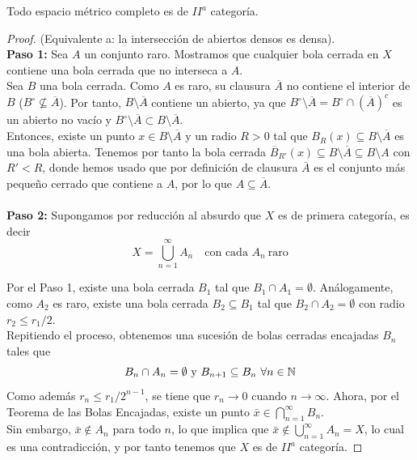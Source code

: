 \begin{teo}\label{teo:baire}
    Todo espacio métrico completo es de $II^a$ categoría.

\begin{proof}
    (Equivalente a: la intersección de abiertos densos es densa). \\
    \noindent
 \textbf{Paso 1:} Sea $A$ un conjunto raro. Mostramos que cualquier bola cerrada en $X$ contiene una bola cerrada que no interseca a $A$.\\
    Sea $B$ una bola cerrada. Como $A$ es raro, su clausura $\overline{A}$ no contiene el interior de $B$ ($B^\circ \not\subseteq \overline{A}$). Por tanto, $B \setminus \overline{A}$ contiene un abierto, ya que $B^\circ \setminus \overline{A}=B^\circ \cap (\overline{A})^c$ es un abierto no vacío y $B^\circ \setminus \overline{A}\subset B \setminus \overline{A}$.\\

    \noindent
    Entonces, existe un punto $x \in B \setminus \overline{A}$ y un radio $R > 0$ tal que $B_R(x) \subseteq B \setminus \overline{A}$ es una bola abierta. Tenemos por tanto la bola cerrada $\overline{B}_{R'}(x) \subseteq B \setminus \overline{A}\subseteq B \setminus A$ con $R' < R$, donde hemos usado que por definición de clausura $\overline{A}$ es el conjunto más pequeño cerrado que contiene a $A$, por lo que $A \subseteq \overline{A}$. \\ \\

    \noindent
    \textbf{Paso 2:} Supongamos por reducción al absurdo que $X$ es de primera categoría, es decir
    $$X = \bigcup_{n=1}^{\infty} A_n \quad \text{con cada } A_n \ \text{raro}$$

    \noindent
    Por el Paso 1, existe una bola cerrada $B_1$ tal que $B_1 \cap A_1 = \emptyset$. Análogamente, como $A_2$ es raro, existe una bola cerrada $B_2 \subseteq B_1$ tal que $B_2 \cap A_2 = \emptyset$ con radio $r_2 \leq r_1/2$. \\

    \noindent
    Repitiendo el proceso, obtenemos una sucesión de bolas cerradas encajadas $B_n$ tales que 
    \begin{equation*}
        B_n \cap A_n = \emptyset \text{ y } B_{n+1}\subseteq B_n \ \forall n \in \mathbb{N} 
    \end{equation*}
    Como además $r_n \leq r_1/2^{n-1}$, se tiene que $r_n \to 0$ cuando $n \to \infty$. Ahora, por el Teorema de las Bolas Encajadas, existe un punto $\bar{x} \in \bigcap_{n=1}^{\infty} B_n$. \\
    \noindent
    Sin embargo, $\bar{x} \notin A_n$ para todo $n$, lo que implica que $\bar{x} \notin \bigcup_{n=1}^{\infty} A_n = X$, lo cual es una contradicción, y por tanto tenemos que $X$ es de $II^a$ categoría.
\end{proof}
\end{teo}

